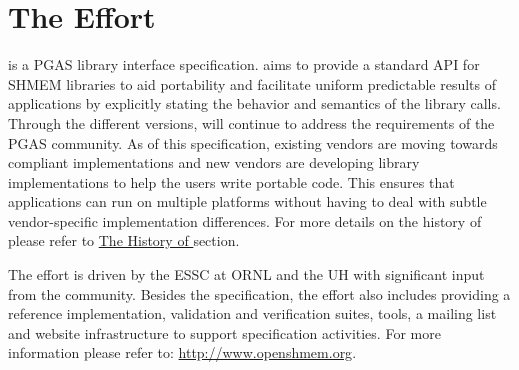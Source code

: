 \section{The \openshmem Effort}

\openshmem is a \ac{PGAS} library interface specification. \openshmem aims to provide a standard \ac{API} for SHMEM libraries to aid portability and facilitate uniform predictable results of \openshmem applications by explicitly stating the behavior and semantics of the \openshmem library calls. Through the different versions, \openshmem will continue to address the requirements of the \ac{PGAS} community. 
As of this specification, existing vendors are moving towards \openshmem compliant implementations and new vendors are developing \openshmem library implementations to help the users write portable \openshmem code. This ensures that applications can run on multiple platforms without having to deal with subtle vendor-specific implementation differences. For more details on the history of 
\openshmem please refer to \hyperref[sec:openshmem_history]{The History of \openshmem} section.  

The \openshmem effort is driven by the \ac{ESSC} at \ac{ORNL} and the \ac{UH} 
with significant input from the \openshmem{} community. Besides the
specification, the effort also includes providing a reference \openshmem implementation,
validation and verification suites, tools, a mailing list and website infrastructure to support
specification activities. For more information please refer to: \url{http://www.openshmem.org}.

